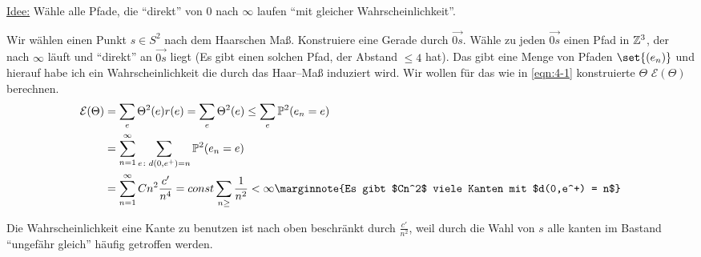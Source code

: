 \begin{beweis}
	\underline{Idee:} Wähle alle Pfade, die \enquote{direkt} von $0$ nach $\infty$ laufen \enquote{mit gleicher Wahrscheinlichkeit}.
	
	Wir wählen einen Punkt $s \in S^2$ nach dem Haarschen Maß. Konstruiere eine Gerade durch $\overrightarrow{0s}$. Wähle zu jeden $\overrightarrow{0s}$ einen Pfad in $\mathbb{Z}^3$, der nach $\infty$ läuft und \enquote{direkt} an $\overrightarrow{0s}$ liegt (Es gibt einen solchen Pfad, der Abstand $\leq 4$ hat). 
	Das gibt eine Menge von Pfaden $\set{(e_n)}$ und hierauf habe ich ein Wahrscheinlichkeit die durch das Haar--Maß induziert wird. Wir wollen für das wie in \eqref{eqn:4-1} konstruierte $\Theta$ $\mathcal{E}(\Theta)$ berechnen.
	\begin{align}
	\mathcal{E}(\Theta) &= \sum\limits_{e} \Theta^2(e) r(e) = \sum\limits_{e}\Theta^2(e) \leq \sum\limits_{e} \prop{e_n=e}[2] \\
	&= \sum\limits_{n=1}^{\infty} \sum\limits_{e\colon d(0,e^+) = n}\prop{e_n = e}[2] \\
	&= \sum\limits_{n = 1}^{\infty}Cn^2\frac{c'}{n^4} = const \sum\limits_{n \geq} \frac{1}{n^2} < \infty \marginnote{Es gibt $Cn^2$ viele Kanten mit $d(0,e^+) = n$} 
	\end{align}
	
	Die Wahrscheinlichkeit eine Kante zu benutzen ist nach oben beschränkt durch $\frac{c'}{n^2}$, weil durch die Wahl von $s$ alle kanten im Bastand \enquote{ungefähr gleich} häufig getroffen werden.
	
\end{beweis}



